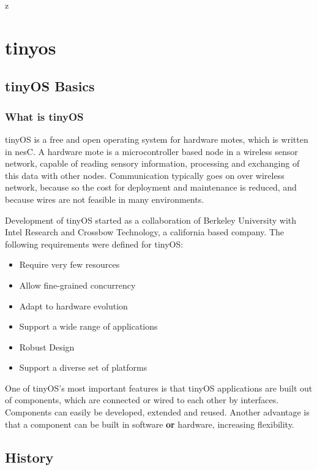 z%

\chapter{tinyos} \label{chapter:tinyos}

\section{tinyOS Basics}

\subsection{What is tinyOS}

tinyOS is a free and open operating system for hardware motes, which is written in nesC. A hardware mote is a microcontroller based node in a wireless sensor network, capable of reading sensory information, processing and exchanging of this data with other nodes. Communication typically goes on over wireless network, because so the cost for deployment and maintenance is reduced, and because wires are not feasible in many environments. 

Development of tinyOS started as a collaboration of Berkeley University with Intel Research and Crossbow Technology, a california based company.
The following requirements were defined for tinyOS:

\begin{itemize}
 \item Require very few resources
 \item Allow fine-grained concurrency
 \item Adapt to hardware evolution
 \item Support a wide range of applications
 \item Robust Design
 \item Support a diverse set of platforms
\end{itemize}

One of tinyOS's most important features is that tinyOS applications are built out of components, which are connected or wired to each other by interfaces. Components can easily be developed, extended and reused. Another advantage is that a component can be built in software \textbf{or} hardware, increasing flexibility. 

\section{History}

